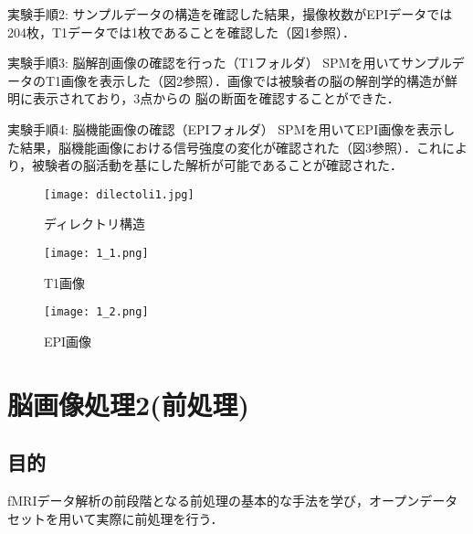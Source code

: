\documentclass{jlreq}
\begin{document}
実験手順2:
サンプルデータの構造を確認した結果，撮像枚数がEPIデータでは204枚，T1データでは1枚であることを確認した（図1参照）．


実験手順3: 脳解剖画像の確認を行った（T1フォルダ）
SPMを用いてサンプルデータのT1画像を表示した（図2参照）．画像では被験者の脳の解剖学的構造が鮮明に表示されており，3点からの
脳の断面を確認することができた．


実験手順4: 脳機能画像の確認（EPIフォルダ）
SPMを用いてEPI画像を表示した結果，脳機能画像における信号強度の変化が確認された（図3参照）．これにより，被験者の脳活動を基にした解析が可能であることが確認された．

\begin{figure}[H]
    \centering
        \begin{minipage}{0.25\textwidth}
        \centering
        \texttt{[image: dilectoli1.jpg]}
        \caption{ディレクトリ構造}
        \label{fig:brain_T1}
    \end{minipage}
    \hfill
    \begin{minipage}{0.2\textwidth}
        \centering
        \texttt{[image: 1\_1.png]}
        \caption{T1画像}
        \label{fig:brain_T1}
    \end{minipage}
    \hfill
    \begin{minipage}{0.2\textwidth}
        \centering
        \texttt{[image: 1\_2.png]}
        \caption{EPI画像}
        \label{fig:brain_EPI}
    \end{minipage}
\end{figure}

\section{脳画像処理2(前処理)}
\subsection{目的}
fMRIデータ解析の前段階となる前処理の基本的な手法を学び，オープンデータセットを用いて実際に前処理を行う．
\end{document}
